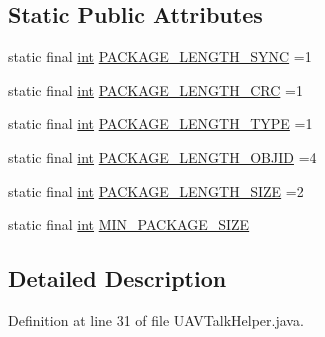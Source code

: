 \subsection*{Static Public Attributes}
\begin{DoxyCompactItemize}
\item 
static final \hyperlink{ioapi_8h_a787fa3cf048117ba7123753c1e74fcd6}{int} \hyperlink{classorg_1_1taulabs_1_1uavtalk_1_1_u_a_v_talk_helper_ab11d89e3277ccd5635a8680386201385}{P\-A\-C\-K\-A\-G\-E\-\_\-\-L\-E\-N\-G\-T\-H\-\_\-\-S\-Y\-N\-C} =1
\item 
static final \hyperlink{ioapi_8h_a787fa3cf048117ba7123753c1e74fcd6}{int} \hyperlink{classorg_1_1taulabs_1_1uavtalk_1_1_u_a_v_talk_helper_ad84005b472609cb580ad2741721d4b72}{P\-A\-C\-K\-A\-G\-E\-\_\-\-L\-E\-N\-G\-T\-H\-\_\-\-C\-R\-C} =1
\item 
static final \hyperlink{ioapi_8h_a787fa3cf048117ba7123753c1e74fcd6}{int} \hyperlink{classorg_1_1taulabs_1_1uavtalk_1_1_u_a_v_talk_helper_a2f030393c6a563452702a5d1c0cc06fd}{P\-A\-C\-K\-A\-G\-E\-\_\-\-L\-E\-N\-G\-T\-H\-\_\-\-T\-Y\-P\-E} =1
\item 
static final \hyperlink{ioapi_8h_a787fa3cf048117ba7123753c1e74fcd6}{int} \hyperlink{classorg_1_1taulabs_1_1uavtalk_1_1_u_a_v_talk_helper_a1c9fe1427e747df427714555bef558f4}{P\-A\-C\-K\-A\-G\-E\-\_\-\-L\-E\-N\-G\-T\-H\-\_\-\-O\-B\-J\-I\-D} =4
\item 
static final \hyperlink{ioapi_8h_a787fa3cf048117ba7123753c1e74fcd6}{int} \hyperlink{classorg_1_1taulabs_1_1uavtalk_1_1_u_a_v_talk_helper_a3429fe1986e7f1fcafdb366cb2cff77b}{P\-A\-C\-K\-A\-G\-E\-\_\-\-L\-E\-N\-G\-T\-H\-\_\-\-S\-I\-Z\-E} =2
\item 
static final \hyperlink{ioapi_8h_a787fa3cf048117ba7123753c1e74fcd6}{int} \hyperlink{classorg_1_1taulabs_1_1uavtalk_1_1_u_a_v_talk_helper_acca7dfc119249e6cd79ce3f4f2a0c980}{M\-I\-N\-\_\-\-P\-A\-C\-K\-A\-G\-E\-\_\-\-S\-I\-Z\-E}
\end{DoxyCompactItemize}


\subsection{Detailed Description}


Definition at line 31 of file U\-A\-V\-Talk\-Helper.\-java.



